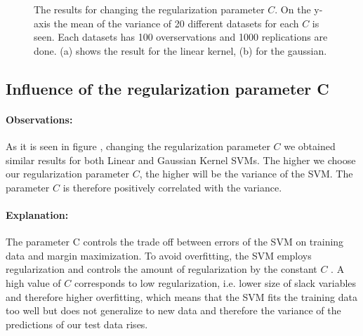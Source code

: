\documentclass[a4paper]{article}
\begin{document}
\begin{figure}[!htb]
\begin{center}

\caption{The results for changing the regularization parameter $C$. On the y-axis the mean of the variance of 20 different datasets for each $C$ is seen. Each datasets has 100 overservations and 1000 replications are done. (a) shows the result for the linear kernel, (b) for the gaussian.}
\label{fig3}
\end{center}
\end{figure}



\subsection{Influence of the regularization parameter C}
\paragraph{Observations:}
As it is seen in figure \label{fig3}, changing the regularization parameter $C$ we obtained similar results for both Linear and Gaussian Kernel SVMs. The higher we choose our regularization parameter $C$, the higher will be the variance of the SVM. The parameter $C$ is therefore positively correlated with the variance.
\paragraph{Explanation:}
The parameter C controls the trade off between errors of the SVM on training data and margin maximization. To avoid overfitting, the SVM employs regularization and controls the amount of regularization by the constant $C$ \cite{hastie_elements_2005}. A high value of $C$ corresponds to low regularization, i.e. lower size of slack variables and therefore higher overfitting, which means that the SVM fits the training data too well but does not generalize to new data and therefore the variance of the predictions of our test data rises.
\end{document}
